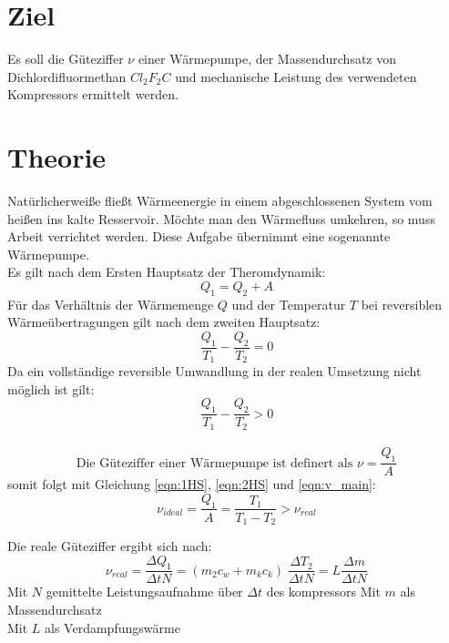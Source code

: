  \section*{Ziel}
    Es soll die Güteziffer $\nu$ einer Wärmepumpe, der Massendurchsatz 
    von Dichlordifluormethan $Cl_2F_2C$ und mechanische Leistung des verwendeten
    Kompressors ermittelt werden.
\section{Theorie}  
\label{sec:theorie}
    Natürlicherweiße fließt Wärmeenergie in einem abgeschlossenen
    System vom heißen ins kalte Resservoir.
    Möchte man den Wärmefluss umkehren, so muss Arbeit verrichtet werden.
    Diese Aufgabe übernimmt eine sogenannte Wärmepumpe.\\
    Es gilt nach dem Ersten Hauptsatz der Theromdynamik:
    \begin{equation}
        Q_1=Q_2+A
        \label{eqn:1HS}
    \end{equation}
    Für das Verhältnis der Wärmemenge $Q$ und der Temperatur $T$ bei reversiblen
    Wärmeübertragungen gilt nach dem zweiten Hauptsatz:
    \begin{equation}
        \frac{Q_1}{T_1}-\frac{Q_2}{T_2}=0
        \label{eqn:2HS}
    \end{equation}
    Da ein vollständige reversible Umwandlung in der realen Umsetzung 
    nicht möglich ist gilt:
    \begin{equation*}
        \frac{Q_1}{T_1}-\frac{Q_2}{T_2}>0
    \end{equation*}\\

    \begin{equation}
        \text{Die Güteziffer einer Wärmepumpe ist definert als } \nu=\frac{Q_1}{A}
        \label{eqn:v_main}
    \end{equation}
    somit folgt mit Gleichung \eqref{eqn:1HS}, \eqref{eqn:2HS} und \eqref{eqn:v_main}:
    \begin{equation}
        \nu_{ideal}=\frac{Q_1}{A}=\frac{T_1}{T_1-T_2}>\nu_{real}
    \end{equation}

    Die reale Güteziffer ergibt sich nach:
    \begin{equation}
        \nu_{real}=\frac{\Delta Q_1}{\Delta tN}=(m_2c_w + m_kc_k)\;\frac{\Delta T_2}{\Delta tN}=L\frac{\Delta m}{\Delta tN}     
    \end{equation}
        Mit $N$ gemittelte Leistungsaufnahme über $\Delta t$ des kompressors \newline
        Mit $m$ als Massendurchsatz\\
        Mit $L$ als Verdampfungswärme

